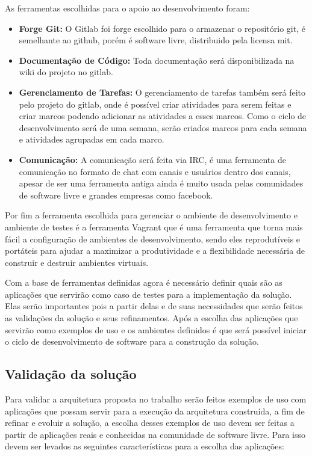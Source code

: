 As ferramentas escolhidas para o apoio ao desenvolvimento foram:
\begin{itemize}
  \item \textbf{Forge Git:} O Gitlab foi forge escolhido para o armazenar o
  repositório git, é semelhante ao github, porém é software livre, distribuido pela
  licensa mit\cite{gitlab}.
  \item \textbf{Documentação de Código:} Toda documentação será disponibilizada
  na wiki do projeto no gitlab.
  \item \textbf{Gerenciamento de Tarefas:} O gerenciamento de tarefas também será
  feito pelo projeto do gitlab, onde é possível criar atividades para serem feitas
  e criar marcos podendo adicionar as atividades a esses marcos. Como o ciclo de
  desenvolvimento será de uma semana, serão criados marcos para cada semana e atividades
  agrupadas em cada marco.
  \item \textbf{Comunicação:} A comunicação será feita via IRC, é uma ferramenta
  de comunicação no formato de chat com canais e usuários dentro dos canais,
  apesar de ser uma ferramenta antiga ainda é muito usada pelas comunidades de software
  livre e grandes empresas como facebook\cite{artigofacebook}.
\end{itemize}

Por fim a ferramenta escolhida para gerenciar o ambiente de desenvolvimento e
ambiente de testes é a ferramenta Vagrant que é uma ferramenta que torna mais fácil
a configuração de ambientes de desenvolvimento, sendo eles reprodutíveis e
portáteis para ajudar a maximizar a produtividade e a flexibilidade necessária
de construir e destruir ambientes virtuais.\cite{vagrant}

Com a base de ferramentas definidas agora é necessário definir quais são as
aplicações que servirão como caso de testes para a implementação da solução. Elas
serão importantes pois a partir delas e de suas necessidades que serão feitos as
validações da solução e seus refinamentos. Após a escolha das aplicações que
servirão como exemplos de uso e os ambientes definidos é que será possível
iniciar o ciclo de desenvolvimento de software para a construção da solução.

\subsection{Validação da solução}
\label{subsection:validacao}

Para validar a arquitetura proposta no trabalho serão feitos exemplos de uso
com aplicações que possam servir para a execução da arquitetura construída, a
fim de refinar e evoluir a solução, a escolha desses exemplos de uso devem ser
feitas a partir de aplicações reais e conhecidas na comunidade de software livre.
 Para isso devem ser levados as seguintes características para a escolha das aplicações:

